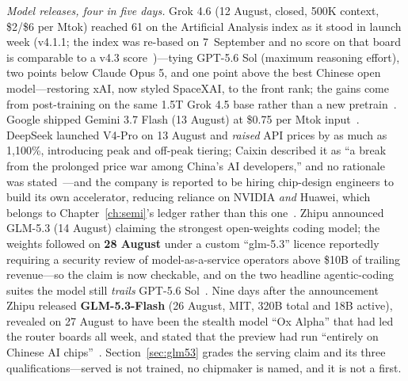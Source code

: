 \emph{Model releases, four in five days.} Grok 4.6 (12 August, closed, 500K context, \$2/\$6 per Mtok) reached 61 on the Artificial Analysis index as it stood in launch week (v4.1.1; the index was re-based on 7~September and no score on that board is comparable to a v4.3 score~\cite{aa-v43})---tying GPT-5.6 Sol (maximum reasoning effort), two points below Claude Opus 5, and one point above the best Chinese open model---restoring xAI, now styled SpaceXAI, to the front rank; the gains come from post-training on the same 1.5T Grok 4.5 base rather than a new pretrain~\cite{grok46}. Google shipped Gemini 3.7 Flash (13 August) at \$0.75 per Mtok input~\cite{gemini37}. DeepSeek launched V4-Pro on 13 August and \emph{raised} API prices by as much as 1{,}100\%, introducing peak and off-peak tiering; Caixin described it as ``a break from the prolonged price war among China's AI developers,'' and no rationale was stated~\cite{deepseek-raise}---and the company is reported to be hiring chip-design engineers to build its own accelerator, reducing reliance on NVIDIA \emph{and} Huawei, which belongs to Chapter~\ref{ch:semi}'s ledger rather than this one~\cite{deepseek-v4pro}. Zhipu announced GLM-5.3 (14 August) claiming the strongest open-weights coding model; the weights followed on \textbf{28 August} under a custom ``glm-5.3'' licence reportedly requiring a security review of model-as-a-service operators above \$10B of trailing revenue---so the claim is now checkable, and on the two headline agentic-coding suites the model still \emph{trails} GPT-5.6 Sol~\cite{glm53}. Nine days after the announcement Zhipu released \textbf{GLM-5.3-Flash} (26 August, MIT, 320B total and 18B active), revealed on 27 August to have been the stealth model ``Ox Alpha'' that had led the router boards all week, and stated that the preview had run ``entirely on Chinese AI chips''~\cite{glm53-flash,glm53-chips}. Section~\ref{sec:glm53} grades the serving claim and its three qualifications---served is not trained, no chipmaker is named, and it is not a first.

